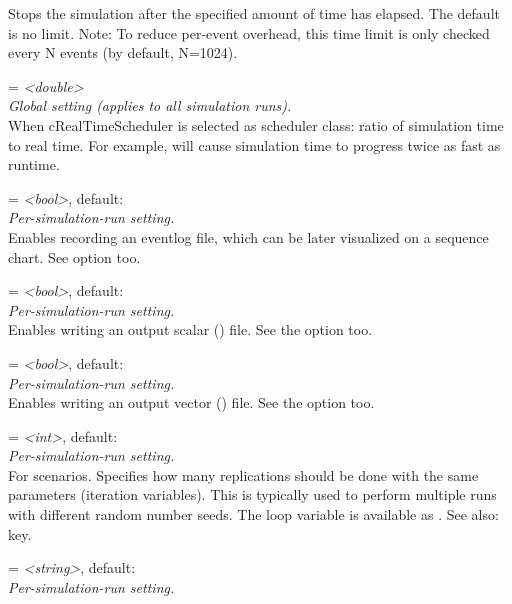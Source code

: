 \begin{description}
    Stops the simulation after the specified amount of time has elapsed. The
    default is no limit. Note: To reduce per-event overhead, this time limit is
    only checked every N events (by default, N=1024).
\item[realtimescheduler-scaling] = \textit{<double>}\\
    \textit{Global setting (applies to all simulation runs).}\\
    When cRealTimeScheduler is selected as scheduler class: ratio of simulation
    time to real time. For example,
     will cause
    simulation time to progress twice as fast as runtime.
\item[record-eventlog] = \textit{<bool>}, default: \\
    \textit{Per-simulation-run setting.}\\
    Enables recording an eventlog file, which can be later visualized on a
    sequence chart. See  option too.
\item[record-scalar-results] = \textit{<bool>}, default: \\
    \textit{Per-simulation-run setting.}\\
    Enables writing an output scalar () file. See the
     option too.
\item[record-vector-results] = \textit{<bool>}, default: \\
    \textit{Per-simulation-run setting.}\\
    Enables writing an output vector () file. See the
     option too.
\item[repeat] = \textit{<int>}, default: \\
    \textit{Per-simulation-run setting.}\\
    For scenarios. Specifies how many replications should be done with the same
    parameters (iteration variables). This is typically used to perform
    multiple runs with different random number seeds. The loop variable is
    available as . See also:
     key.
\item[replication-label] = \textit{<string>}, default: \\
    \textit{Per-simulation-run setting.}\\

\end{description}
